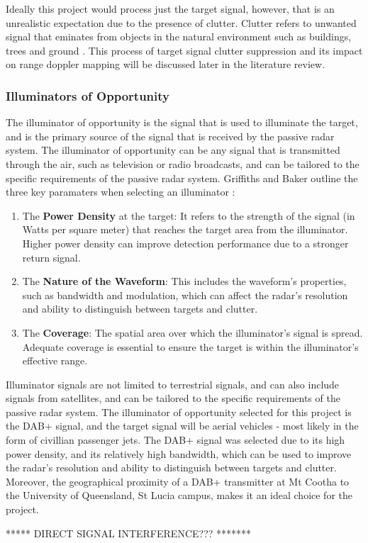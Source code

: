 \documentclass[12pt,a4paper]{article}
\begin{document}
\par \vspace{0.5cm} 
\noindent Ideally this project would process just the target signal, however, that is an unrealistic expectation due to the presence of clutter. Clutter refers to unwanted signal that eminates from objects in the natural environment such as buildings, trees and ground \cite{zhang2023intelligent}. This process of target signal clutter suppression and its impact on range doppler mapping will be discussed later in the literature review.  

\subsubsection{Illuminators of Opportunity}
The illuminator of opportunity is the signal that is used to illuminate the target, and is the primary source of the signal that is received by the passive radar system. The illuminator of opportunity can be any signal that is transmitted through the air, such as television or radio broadcasts, and can be tailored to the specific requirements of the passive radar system. Griffiths and Baker outline the three key paramaters when selecting an illuminator \cite{INTRO2017}:
\begin{enumerate}[label=\arabic*.]
    \item The \textbf{Power Density} at the target: It refers to the strength of the signal (in Watts per square meter) that reaches the target area from the illuminator. Higher power density can improve detection performance due to a stronger return signal.
    \item The \textbf{Nature of the Waveform}: This includes the waveform's properties, such as bandwidth and modulation, which can affect the radar's resolution and ability to distinguish between targets and clutter.
    \item The \textbf{Coverage}: The spatial area over which the illuminator's signal is spread. Adequate coverage is essential to ensure the target is within the illuminator's effective range.
\end{enumerate}
Illuminator signals are not limited to terrestrial signals, and can also include signals from satellites, and can be tailored to the specific requirements of the passive radar system. The illuminator of opportunity selected for this project is the DAB+  signal, and the target signal will be aerial vehicles - most likely in the form of civillian passenger jets. The DAB+ signal was selected due to its high power density, and its relatively high bandwidth, which can be used to improve the radar's resolution and ability to distinguish between targets and clutter. Moreover, the geographical proximity of a DAB+ transmitter at Mt Cootha to the University of Queensland, St Lucia campus, makes it an ideal choice for the project.
\par \vspace{0.5cm} 
\noindent ****** DIRECT SIGNAL INTERFERENCE??? *******
\end{document}
